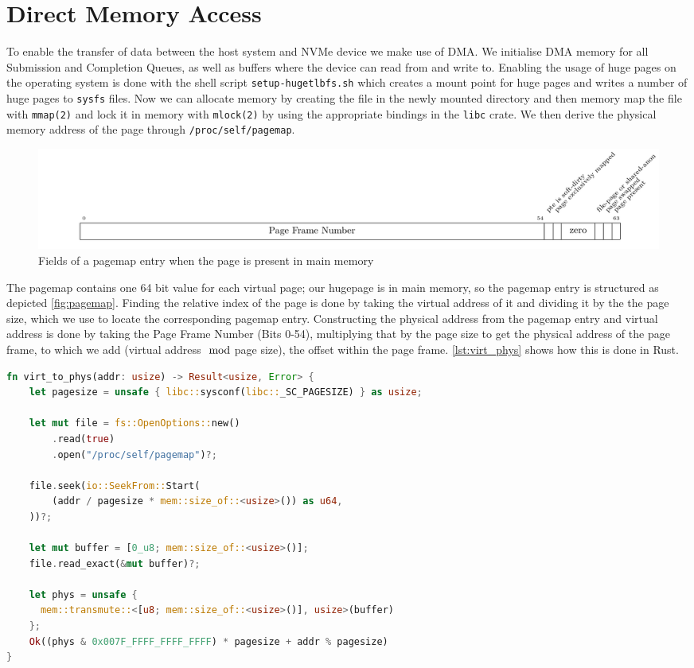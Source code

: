 \section{Direct Memory Access}
To enable the transfer of data between the host system and NVMe device we make use of DMA. We initialise DMA memory for all Submission and Completion Queues, as well as buffers where the device can read from and write to.
Enabling the usage of huge pages on the operating system is done with the shell script \texttt{setup-hugetlbfs.sh} which creates a mount point for huge pages and writes a number of huge pages to \texttt{sysfs} files. Now we can allocate memory by creating the file in the newly mounted directory and then memory map the file with \texttt{mmap(2)} and lock it in memory with \texttt{mlock(2)} by using the appropriate bindings in the \texttt{libc} crate. We then derive the physical memory address of the page through \texttt{/proc/self/pagemap}.

\begin{figure}
  \centering
    \includegraphics[width=\textwidth]{figures/pagemap}
    \caption{Fields of a pagemap entry when the page is present in main memory}
    \label{fig:pagemap}
\end{figure}

The pagemap contains one 64 bit value for each virtual page; our hugepage is in main memory, so the pagemap entry is structured as depicted \autoref{fig:pagemap}. Finding the relative index of the page is done by taking the virtual address of it and dividing it by the the page size, which we use to locate the corresponding pagemap entry. Constructing the physical address from the pagemap entry and virtual address is done by taking the Page Frame Number (Bits 0-54), multiplying that by the page size to get the physical address of the page frame, to which we add (virtual address$\mod$page size), the offset within the page frame. \autoref{lst:virt_phys} shows how this is done in Rust.

\begin{lstlisting}[float, language=Rust, label=lst:virt_phys,caption=Translating a virtual address to its physical address]
fn virt_to_phys(addr: usize) -> Result<usize, Error> {
    let pagesize = unsafe { libc::sysconf(libc::_SC_PAGESIZE) } as usize;

    let mut file = fs::OpenOptions::new()
        .read(true)
        .open("/proc/self/pagemap")?;

    file.seek(io::SeekFrom::Start(
        (addr / pagesize * mem::size_of::<usize>()) as u64,
    ))?;

    let mut buffer = [0_u8; mem::size_of::<usize>()];
    file.read_exact(&mut buffer)?;

    let phys = unsafe {
      mem::transmute::<[u8; mem::size_of::<usize>()], usize>(buffer)
    };
    Ok((phys & 0x007F_FFFF_FFFF_FFFF) * pagesize + addr % pagesize)
}
\end{lstlisting}

